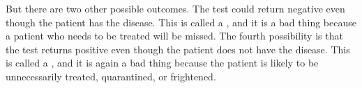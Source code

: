 But there are two other
possible outcomes. The test could return negative even though the
patient has the disease. This is called a ,
and it is a bad thing because a patient who needs to be treated will be missed. The fourth possibility is that the test returns positive
even though the patient does not have the disease. This is called a
, and it is again a bad thing because the
patient is likely to be unnecessarily treated, quarantined, or frightened.






